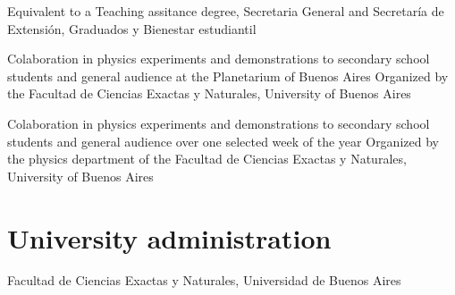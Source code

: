 \documentclass[11pt, a4paper]{moderncv}
\begin{document}
{Equivalent to a Teaching assitance degree, Secretaria General and Secretaría de Extensión, Graduados y Bienestar estudiantil}{}{}

{Colaboration in physics experiments and demonstrations to secondary school students and general audience at the Planetarium of Buenos Aires}
{Organized by the Facultad de Ciencias Exactas y Naturales, University of Buenos Aires}{}

{Colaboration in physics experiments and demonstrations to secondary school students and general audience over one selected week of the year}
{Organized by the physics department of the Facultad de Ciencias Exactas y Naturales, University of Buenos Aires}{}{}%


\section{University administration}
{Facultad de Ciencias Exactas y Naturales, Universidad de Buenos Aires}{}
\end{document}
